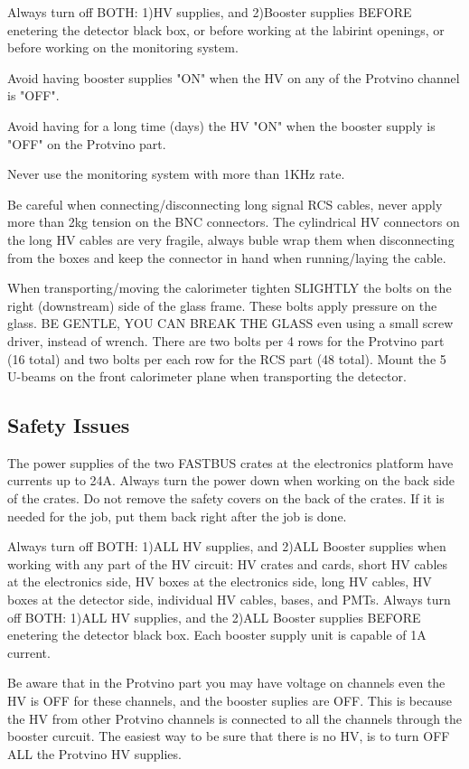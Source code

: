 \documentclass{chowto}
\begin{document}
Always turn off BOTH: 1)HV supplies, and 2)Booster supplies BEFORE enetering the 
detector black box, or before working at the labirint openings, or before working 
on the monitoring system.

Avoid having booster supplies "ON" when the HV on any of the Protvino channel is "OFF".

Avoid having for a long time (days) the HV "ON" when the booster supply is "OFF" on 
the Protvino part.

Never use the monitoring system with more than 1KHz rate.

Be careful when connecting/disconnecting long signal RCS cables, never apply 
more than 2kg tension on the BNC connectors. The cylindrical HV connectors on 
the long HV cables are very fragile, always buble wrap them when disconnecting 
from the boxes and keep the connector in hand when running/laying the cable.

When transporting/moving the calorimeter tighten SLIGHTLY the bolts on the 
right (downstream) side of the glass frame. These bolts apply pressure on the 
glass. BE GENTLE, YOU CAN BREAK THE GLASS even using a small screw driver, instead 
of wrench. There are two bolts per 4 rows for the Protvino part (16 total) and 
two bolts per each row for the RCS part (48 total). Mount the 5 U-beams on the 
front calorimeter plane when transporting the detector.  

\subsection{Safety Issues}

The power supplies of the two FASTBUS crates at the electronics platform have currents up to 24A. 
Always turn the power down when working on the back side of the crates. Do not remove the safety 
covers on the back of the crates. If it is needed for the job, put them back right after the job is done.

Always turn off BOTH: 1)ALL HV supplies, and 2)ALL Booster supplies when working with any part 
of the HV circuit: HV crates and cards, short HV cables at the electronics side, HV boxes at the 
electronics side, long HV cables, HV boxes at the detector side, individual HV cables, bases, 
and PMTs. Always turn off BOTH: 1)ALL HV supplies, and the 2)ALL Booster supplies BEFORE 
enetering the detector black box. Each booster supply unit is capable of 1A current.

Be aware that in the Protvino part you may have voltage on channels even the HV is OFF for 
these channels, and the booster suplies are OFF. This is because the HV from other Protvino 
channels is connected to all the channels through the booster curcuit. The easiest way to be 
sure that there is no HV, is to turn OFF ALL the Protvino HV supplies.
\end{document}
